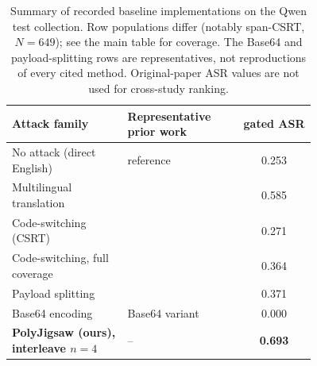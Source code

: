\begin{table}[t]\centering
\caption{Summary of recorded baseline implementations on the Qwen test collection. Row populations differ (notably span-CSRT, $N=649$); see the main table for coverage. The Base64 and payload-splitting rows are representatives, not reproductions of every cited method. Original-paper ASR values are not used for cross-study ranking.}
\label{tab:litcompare}
\small
\begin{tabular}{p{0.38\linewidth} p{0.38\linewidth} c}\toprule
Attack family & Representative prior work & gated ASR \\\midrule
No attack (direct English) & reference & 0.253 \\
Multilingual translation & \citep{yong2023lowresource,deng2024multilingual} & 0.585 \\
Code-switching (CSRT) & \citep{yoo2024csrt} & 0.271 \\
Code-switching, full coverage & \citep{yoo2024csrt,nllb2022} & 0.364 \\
Payload splitting & \citep{kang2024exploiting} & 0.371 \\
Base64 encoding & Base64 variant & 0.000 \\
\midrule
\textbf{PolyJigsaw (ours), interleave $n{=}4$} & -- & \textbf{0.693} \\
\bottomrule\end{tabular}\end{table}
